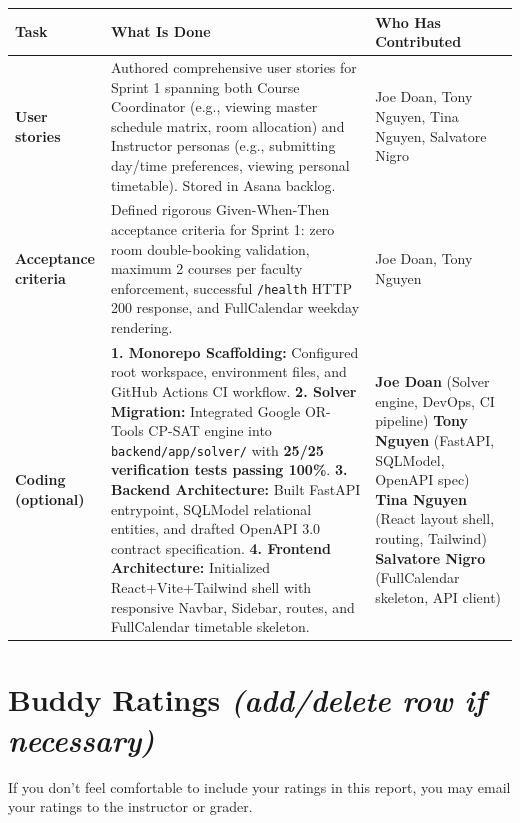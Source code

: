 \documentclass[11pt,letterpaper]{article}
\begin{document}
\vspace{0.4em}
\renewcommand{\arraystretch}{1.28}
\noindent
\begin{tabularx}{\textwidth}{|p{3.4cm}|X|p{4.2cm}|}
\hline
\rowcolor{tableheader}
\textbf{\sffamily Task} & \textbf{\sffamily What Is Done} & \textbf{\sffamily Who Has Contributed} \\ \hline
\textbf{User stories} & Authored comprehensive user stories for Sprint 1 spanning both Course Coordinator (e.g., viewing master schedule matrix, room allocation) and Instructor personas (e.g., submitting day/time preferences, viewing personal timetable). Stored in Asana backlog. & Joe Doan, Tony Nguyen, Tina Nguyen, Salvatore Nigro \\ \hline
\textbf{Acceptance criteria} & Defined rigorous Given-When-Then acceptance criteria for Sprint 1: zero room double-booking validation, maximum 2 courses per faculty enforcement, successful \texttt{/health} HTTP 200 response, and FullCalendar weekday rendering. & Joe Doan, Tony Nguyen \\ \hline
\textbf{Coding (optional)} & \textbf{1. Monorepo Scaffolding:} Configured root workspace, environment files, and GitHub Actions CI workflow.\newline
\textbf{2. Solver Migration:} Integrated Google OR-Tools CP-SAT engine into \texttt{backend/app/solver/} with \textbf{25/25 verification tests passing 100\%}.\newline
\textbf{3. Backend Architecture:} Built FastAPI entrypoint, SQLModel relational entities, and drafted OpenAPI 3.0 contract specification.\newline
\textbf{4. Frontend Architecture:} Initialized React+Vite+Tailwind shell with responsive Navbar, Sidebar, routes, and FullCalendar timetable skeleton. & 
\textbf{Joe Doan} (Solver engine, DevOps, CI pipeline)\newline
\textbf{Tony Nguyen} (FastAPI, SQLModel, OpenAPI spec)\newline
\textbf{Tina Nguyen} (React layout shell, routing, Tailwind)\newline
\textbf{Salvatore Nigro} (FullCalendar skeleton, API client) \\ \hline
\end{tabularx}

\vspace{1.0em}

\section{Buddy Ratings \textnormal{\small\textit{(add/delete row if necessary)}}}
If you don't feel comfortable to include your ratings in this report, you may email your ratings to the instructor or grader.
\end{document}
